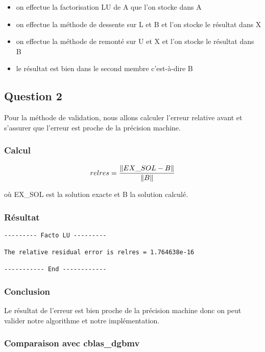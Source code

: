 \documentclass[11pt]{article}
\DeclarePairedDelimiter{\norm}{\lVert}{\rVert}
\begin{document}
\begin{itemize}
\item on effectue la factorisation LU de A que l'on stocke dans A
\item on effectue la méthode de dessente sur L et B et l'on stocke le
  résultat dans X
\item on effectue la méthode de remonté sur U et X et l'on stocke le
  résultat dans B
\item le résultat est bien dans le second membre c'est-à-dire B
\end{itemize}

\subsection{Question 2}

Pour la méthode de validation, nous allons calculer l'erreur relative
avant et s'assurer que l'erreur est proche de la précision machine.

\subsubsection{Calcul}

\begin{equation*}
relres = \frac{\norm{EX\_SOL - B}}{\norm{B}}
\end{equation*}

où EX\_SOL est la solution exacte et B la solution calculé.

\subsubsection{Résultat}

\begin{lstlisting}
--------- Facto LU ---------

The relative residual error is relres = 1.764638e-16

----------- End ------------
\end{lstlisting}

\subsubsection{Conclusion}

Le résultat de l'erreur est bien proche de la précision machine donc
on peut valider notre algorithme et notre implémentation.

\subsubsection{Comparaison avec cblas\_dgbmv}
\end{document}

